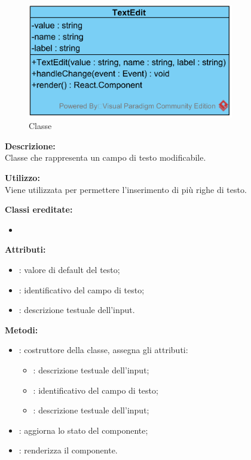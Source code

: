 \paragraph[::TextEdit]{\class}\mbox{}\\ \label{\class}
\begin{figure}[H]
	\centering
	\includegraphics[width=9cm]{./diagrammi/framework/view/gui/textedit.png}
	\caption{Classe \class}
\end{figure}
\textbf{Descrizione:}\\
Classe che rappresenta un campo di testo modificabile.

\textbf{Utilizzo:}\\
Viene utilizzata per permettere l'inserimento di più righe di testo.

\textbf{Classi ereditate:}
\begin{itemize}
	\item {}
\end{itemize}


\textbf{Attributi:}
\begin{itemize}
	\item {}: valore di default del testo;
	\item {}: identificativo del campo di testo;
	\item {}: descrizione testuale dell'input.
\end{itemize}

\textbf{Metodi:}
\begin{itemize}
	\item {}: costruttore della classe, assegna gli attributi:
	\begin{itemize}
		\item {}: descrizione testuale dell'input;
		\item {}: identificativo del campo di testo;
		\item {}: descrizione testuale dell'input;
	\end{itemize}
	\item {}: aggiorna lo stato del componente;
	\item {}: renderizza il componente.
\end{itemize}


